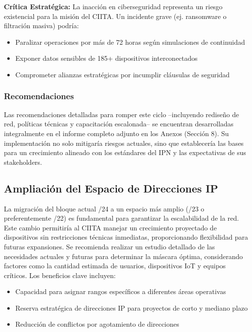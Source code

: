 \textbf{Crítica Estratégica:}  
La inacción en ciberseguridad representa un riesgo existencial para la misión del CIITA. Un incidente grave (ej. ransomware o filtración masiva) podría:
\begin{itemize}
	\item Paralizar operaciones por más de 72 horas según simulaciones de continuidad
	\item Exponer datos sensibles de 185+ dispositivos interconectados
	\item Comprometer alianzas estratégicas por incumplir cláusulas de seguridad
\end{itemize}

\subsubsection{Recomendaciones}

Las recomendaciones detalladas para romper este ciclo –incluyendo rediseño de red, políticas técnicas y capacitación escalonada– se encuentran desarrolladas integralmente en el informe completo adjunto en los Anexos (Sección 8). Su implementación no solo mitigaría riesgos actuales, sino que establecería las bases para un crecimiento alineado con los estándares del IPN y las expectativas de sus stakeholders.

\subsection*{Ampliación del Espacio de Direcciones IP}
La migración del bloque actual /24 a un espacio más amplio (/23 o preferentemente /22) es fundamental para garantizar la escalabilidad de la red. Este cambio permitiría al CIITA manejar un crecimiento proyectado de dispositivos sin restricciones técnicas inmediatas, proporcionando flexibilidad para futuras expansiones. Se recomienda realizar un estudio detallado de las necesidades actuales y futuras para determinar la máscara óptima, considerando factores como la cantidad estimada de usuarios, dispositivos IoT y equipos críticos. Los beneficios clave incluyen:

\begin{itemize}
	\item Capacidad para asignar rangos específicos a diferentes áreas operativas
	\item Reserva estratégica de direcciones IP para proyectos de corto y mediano plazo
	\item Reducción de conflictos por agotamiento de direcciones
\end{itemize}

